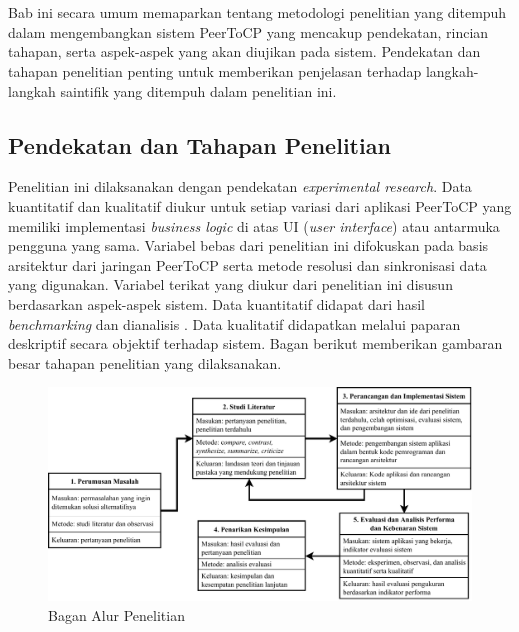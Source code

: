 \chapter{\babTiga}
\label{bab:3}

Bab ini secara umum memaparkan tentang metodologi penelitian yang ditempuh dalam mengembangkan sistem PeerToCP yang mencakup pendekatan, rincian tahapan, serta aspek-aspek yang akan diujikan pada sistem. Pendekatan dan tahapan penelitian penting untuk memberikan penjelasan terhadap langkah-langkah saintifik yang ditempuh dalam penelitian ini.

\section{Pendekatan dan Tahapan Penelitian}
\label{sec:pendekatan}
Penelitian ini dilaksanakan dengan pendekatan \textit{experimental research}. Data kuantitatif dan kualitatif diukur untuk setiap variasi dari aplikasi PeerToCP yang memiliki implementasi \textit{business logic} di atas UI (\textit{user interface}) atau antarmuka pengguna yang sama. Variabel bebas dari penelitian ini difokuskan pada basis arsitektur dari jaringan PeerToCP serta metode resolusi dan sinkronisasi data yang digunakan. Variabel terikat yang diukur dari penelitian ini disusun berdasarkan aspek-aspek sistem. Data kuantitatif didapat dari hasil \textit{benchmarking} dan dianalisis . Data kualitatif didapatkan melalui paparan deskriptif secara objektif terhadap sistem. Bagan berikut memberikan gambaran besar tahapan penelitian yang dilaksanakan.

\begin{figure}
    \centering
    \includegraphics[scale=0.7]{assets/skripsi/Metode_Penelitian}
    \caption{Bagan Alur Penelitian}
    \label{bagan}
\end{figure}

